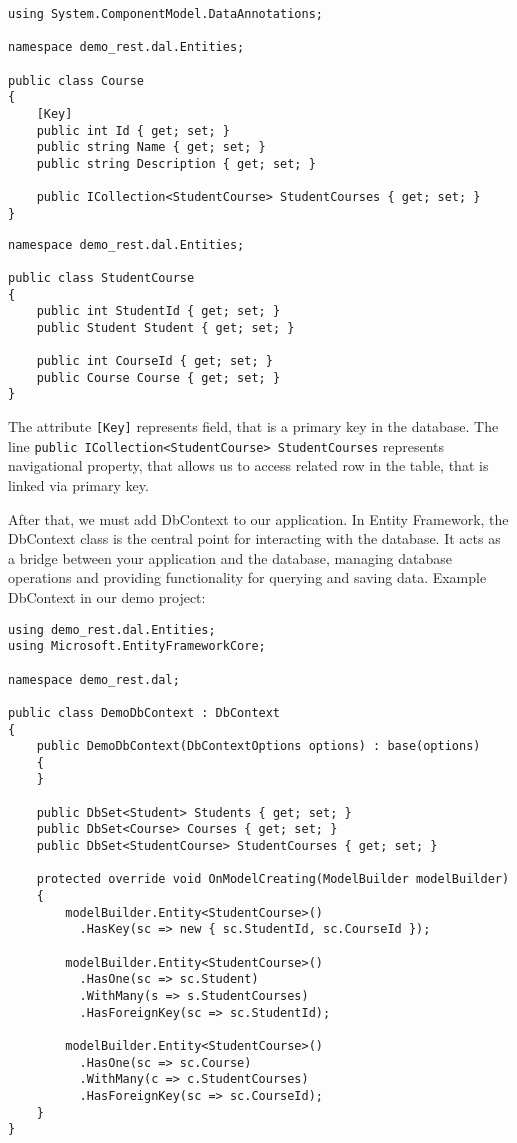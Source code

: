 \begin{lstlisting}
using System.ComponentModel.DataAnnotations;

namespace demo_rest.dal.Entities;

public class Course
{
    [Key]
    public int Id { get; set; }
    public string Name { get; set; }
    public string Description { get; set; }

    public ICollection<StudentCourse> StudentCourses { get; set; }
}

\end{lstlisting}

\begin{lstlisting}
namespace demo_rest.dal.Entities;

public class StudentCourse
{
    public int StudentId { get; set; }
    public Student Student { get; set; }

    public int CourseId { get; set; }
    public Course Course { get; set; }
}

\end{lstlisting}

The attribute \lstinline{[Key]} represents field, that is a primary key in the database. The line \lstinline{public ICollection<StudentCourse> StudentCourses} represents navigational property, that allows us to access related row in the table, that is linked via primary key.

After that, we must add DbContext to our application. In Entity Framework, the DbContext class is the central point for interacting with the database. It acts as a bridge between your application and the database, managing database operations and providing functionality for querying and saving data. Example DbContext in our demo project:

\begin{lstlisting}
using demo_rest.dal.Entities;
using Microsoft.EntityFrameworkCore;

namespace demo_rest.dal;

public class DemoDbContext : DbContext
{
    public DemoDbContext(DbContextOptions options) : base(options)
    {
    }

    public DbSet<Student> Students { get; set; }
    public DbSet<Course> Courses { get; set; }
    public DbSet<StudentCourse> StudentCourses { get; set; }

    protected override void OnModelCreating(ModelBuilder modelBuilder)
    {
        modelBuilder.Entity<StudentCourse>()
          .HasKey(sc => new { sc.StudentId, sc.CourseId });

        modelBuilder.Entity<StudentCourse>()
          .HasOne(sc => sc.Student)
          .WithMany(s => s.StudentCourses)
          .HasForeignKey(sc => sc.StudentId);

        modelBuilder.Entity<StudentCourse>()
          .HasOne(sc => sc.Course)
          .WithMany(c => c.StudentCourses)
          .HasForeignKey(sc => sc.CourseId);
    }
}
\end{lstlisting}

